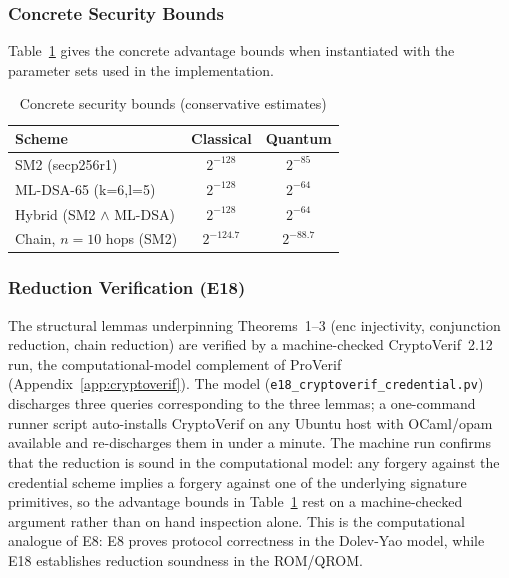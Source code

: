 \documentclass[10pt,twocolumn]{IEEEtran}
\begin{document}
\subsubsection{Concrete Security Bounds}

Table~\ref{tab:concrete} gives the concrete advantage bounds when
instantiated with the parameter sets used in the implementation.

\begin{table}[t]
  \caption{Concrete security bounds (conservative estimates)}
  \label{tab:concrete}
  \centering\small\setlength{\tabcolsep}{4pt}
  \begin{tabular}{lcc}
    \toprule
    \textbf{Scheme} & \textbf{Classical} & \textbf{Quantum} \\
    \midrule
    SM2 (secp256r1) & $2^{-128}$ & $2^{-85}$ \\
    ML-DSA-65 (k=6,l=5) & $2^{-128}$ & $2^{-64}$ \\
    Hybrid (SM2 $\land$ ML-DSA) & $2^{-128}$ & $2^{-64}$ \\
    Chain, $n=10$ hops (SM2) & $2^{-124.7}$ & $2^{-88.7}$ \\
    \bottomrule
  \end{tabular}
\end{table}

\subsubsection{Reduction Verification (E18)}
The structural lemmas underpinning Theorems~1--3
(enc injectivity, conjunction reduction, chain reduction) are verified
by a machine-checked CryptoVerif~2.12~\cite{ref:cryptoverif} run,
the computational-model complement of ProVerif
(Appendix~\ref{app:cryptoverif}). The model
(\texttt{e18\_cryptoverif\_credential.pv}) discharges three queries
corresponding to the three lemmas; a one-command runner script
auto-installs CryptoVerif on any Ubuntu host with OCaml/opam available
and re-discharges them in under a minute. The machine run confirms that
the reduction is sound in the computational model: any forgery against
the credential scheme implies a forgery against one of the underlying
signature primitives, so the advantage bounds in
Table~\ref{tab:concrete} rest on a machine-checked argument rather than
on hand inspection alone. This is the computational analogue of
E8: E8 proves protocol correctness in the Dolev-Yao model, while E18
establishes reduction soundness in the ROM/QROM.
\end{document}
